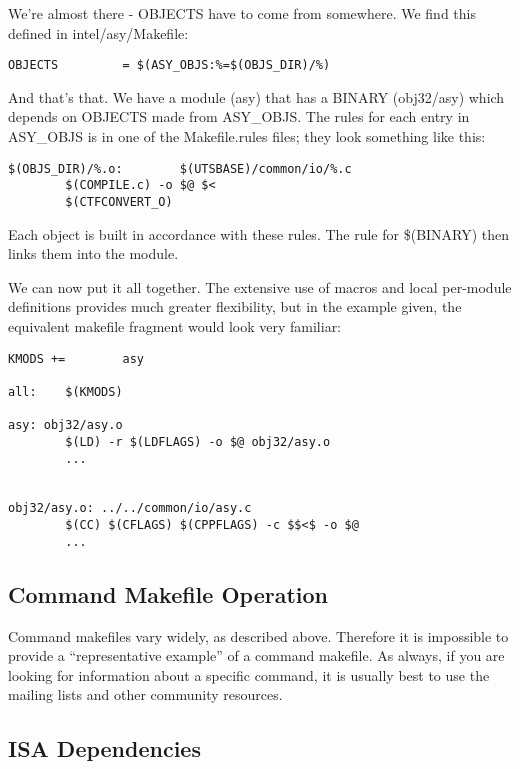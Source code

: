 \documentclass{article}
\begin{document}
We're almost there - OBJECTS have to come from somewhere. We find this defined
in intel/asy/Makefile:

\begin{verbatim}
OBJECTS         = $(ASY_OBJS:%=$(OBJS_DIR)/%)
\end{verbatim}

\vspace{0.2cm}
And that's that. We have a module (asy) that has a BINARY (obj32/asy) which
depends on OBJECTS made from ASY\_OBJS. The rules for each entry in ASY\_OBJS is
in one of the Makefile.rules files; they look something like this:

\begin{verbatim}
$(OBJS_DIR)/%.o:        $(UTSBASE)/common/io/%.c
        $(COMPILE.c) -o $@ $<
        $(CTFCONVERT_O)
\end{verbatim}

Each object is built in accordance with these rules. The rule for \$(BINARY)
then links them into the module.

We can now put it all together. The extensive use of macros and local per-module
definitions provides much greater flexibility, but in the example given, the
equivalent makefile fragment would look very familiar:

\begin{verbatim}
KMODS +=        asy

all:    $(KMODS)

asy: obj32/asy.o
        $(LD) -r $(LDFLAGS) -o $@ obj32/asy.o
        ...


obj32/asy.o: ../../common/io/asy.c
        $(CC) $(CFLAGS) $(CPPFLAGS) -c $$<$ -o $@
        ...
\end{verbatim}

\subsection*{Command Makefile Operation}

Command makefiles vary widely, as described above. Therefore it is impossible
to provide a ``representative example'' of a command makefile. As always, if you
are looking for information about a specific command, it is usually best to use
the mailing lists and other community resources.


\subsection*{ISA Dependencies}
\end{document}
